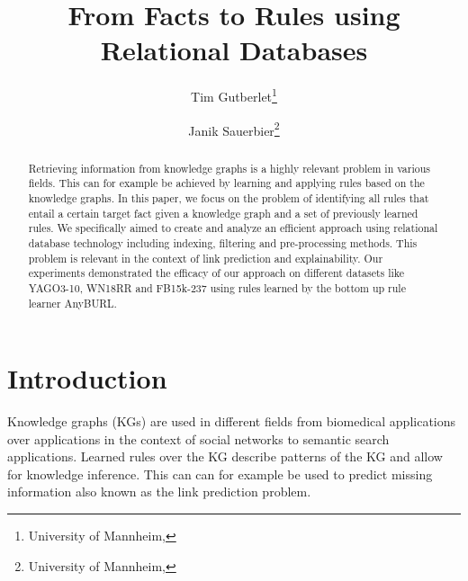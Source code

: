 \documentclass[english]{lni}
\begin{document}
\title[From Facts to Rules using Relational Databases]{From Facts to Rules using Relational Databases}
\author[Tim Gutberlet \and Janik Sauerbier]
{Tim Gutberlet\footnote{University of Mannheim, } \and
Janik Sauerbier\footnote{University of Mannheim, }}
\maketitle

\begin{abstract}
 Retrieving information from knowledge graphs is a highly relevant problem in various fields. This can for example be achieved by learning and applying rules based on the knowledge graphs. In this paper, we focus on the problem of identifying all rules that entail a certain target fact given a knowledge graph and a set of previously learned rules. We specifically aimed to create and analyze an efficient approach using relational database technology including indexing, filtering and pre-processing methods. This problem is relevant in the context of link prediction and explainability. Our experiments demonstrated the efficacy of our approach on different datasets like YAGO3-10, WN18RR and FB15k-237 using rules learned by the bottom up rule learner AnyBURL. 
\end{abstract}
\section{Introduction}
Knowledge graphs (KGs) are used in different fields from biomedical applications \cite{OpenBioLink} over applications in the context of social networks \cite{SocialNetworks} to semantic search applications\cite{SemanticSearch}. Learned rules over the KG describe patterns of the KG and allow for knowledge inference. This can can for example be used to predict missing information also known as the link prediction problem.
\end{document}
